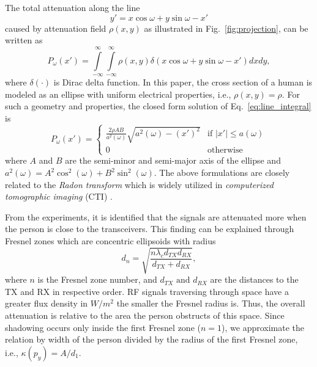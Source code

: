 \documentclass[journal, 10pt, twocolumn, balance]{IEEEtran}
\begin{document}
The total attenuation along the line 
\begin{equation}\label{eq:line_equation}
	y' = x \cos\omega + y \sin\omega  - x' 
\end{equation}
caused by attenuation field $\rho(x,y)$ as illustrated in Fig.~\ref{fig:projection}, can be written as \cite[Ch. 3]{Kak1988}
\begin{equation}\label{eq:line_integral}
	P_{\omega}(x') = \int\limits_{-\infty}^{\infty} \int\limits_{-\infty}^{\infty} \rho(x,y) \delta(x \cos\omega + y \sin\omega - x') dx dy,
\end{equation}
where $\delta(\cdot)$ is Dirac delta function. In this paper, the cross section of a human is modeled as an ellipse with uniform electrical properties, i.e., $\rho(x,y) = \rho$. For such a geometry and properties, the closed form solution of Eq.~\eqref{eq:line_integral} is 
\begin{equation}\label{eq:projection}
    P_{\omega}(x')  =  \begin{cases}
                       \frac{2{\rho}AB}{a^2(\omega)}\sqrt{a^2(\omega) - (x')^2} & \text{if } \lvert x' \rvert \leq a(\omega)  \\
                       0 & \text{otherwise}
               \end{cases}
\end{equation}
where $A$ and $B$ are the semi-minor and semi-major axis of the ellipse and $a^2(\omega) = A^2\cos^2(\omega) + B^2\sin^2(\omega)$. The above formulations are closely related to the \emph{Radon transform} which is widely utilized in \emph{computerized tomographic imaging} (CTI) \cite[Ch. 3]{Kak1988}. 


From the experiments, it is identified that the signals are attenuated more when the person is close to the transceivers. This finding can be explained through Fresnel zones which are concentric ellipsoids with radius \cite[pp. 126-135]{rappaport1996}
\begin{equation}\label{eq:freznel_radius}
	d_n = \sqrt{\frac{n\lambda_c d_{TX} d_{RX}}{d_{TX} + d_{RX}}},
\end{equation}
where $n$ is the Fresnel zone number, and $d_{TX} \text{ and } d_{RX}$ are the distances to the TX and RX in respective order. RF signals traversing through space have a greater flux density in $W/m^2$ the smaller the Fresnel radius is. Thus, the overall attenuation is relative to the area the person obstructs of this space. Since shadowing occurs only inside the first Fresnel zone ($n=1$), we approximate the relation by width of the person divided by the radius of the first Fresnel zone, i.e., $\kappa(p_y) = A/d_1$. 
\end{document}
